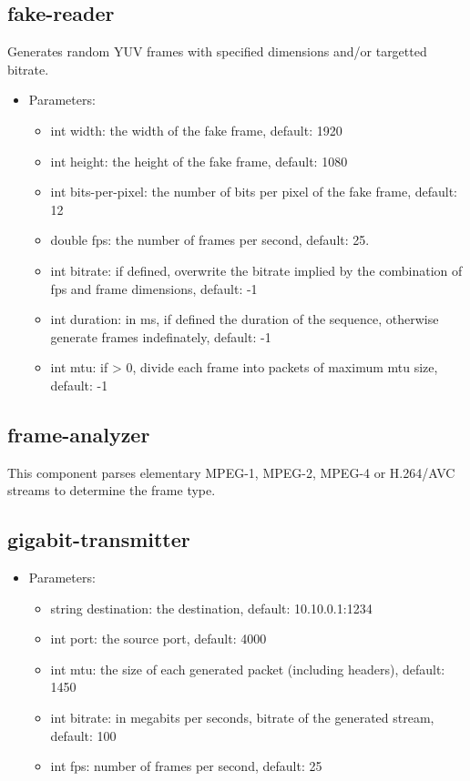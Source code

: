 \subsection{fake-reader}
Generates random YUV frames with specified dimensions and/or targetted bitrate.
\begin{itemize}
\item Parameters:
\begin{itemize}
\item int width: the width of the fake frame, default: 1920
\item int height: the height of the fake frame, default: 1080
\item int bits-per-pixel: the number of bits per pixel of the fake frame, default: 12
\item double fps: the number of frames per second, default: 25.
\item int bitrate: if defined, overwrite the bitrate implied by the combination of fps and frame dimensions, default: -1
\item int duration: in ms, if defined the duration of the sequence, otherwise generate frames indefinately, default: -1
\item int mtu: if > 0, divide each frame into packets of maximum mtu size, default: -1
\end{itemize}
\end{itemize}
\subsection{frame-analyzer}
This component parses elementary MPEG-1, MPEG-2, MPEG-4 or H.264/AVC streams to determine the frame type.
\subsection{gigabit-transmitter}

\begin{itemize}
\item Parameters:
\begin{itemize}
\item string destination: the destination, default: 10.10.0.1:1234
\item int port: the source port, default: 4000
\item int mtu: the size of each generated packet (including headers), default: 1450
\item int bitrate: in megabits per seconds, bitrate of the generated stream, default: 100
\item int fps: number of frames per second, default: 25
\end{itemize}
\end{itemize}
